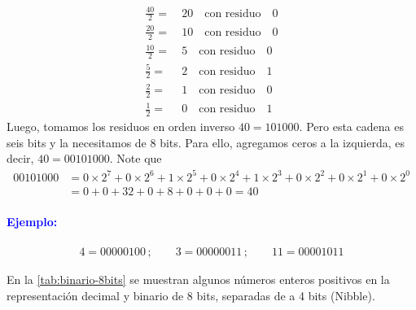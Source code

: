 \documentclass[12pt]{article}
\begin{document}
\begin{align*}
\frac{40}{2} = & ~20 \quad \text{con residuo} \quad  0 \\
\frac{20}{2} = & ~10 \quad \text{con residuo} \quad  0 \\
\frac{10}{2} = & ~5 \quad \text{con residuo} \quad  0 \\
\frac{5}{2} =  & ~2 \quad \text{con residuo} \quad  1 \\
\frac{2}{2} =  & ~1 \quad \text{con residuo} \quad  0 \\
\frac{1}{2} =  & ~0 \quad \text{con residuo} \quad  1 
\end{align*}
Luego, tomamos los residuos en orden inverso $40 = 101000$. Pero esta cadena es seis bits 
y la necesitamos de 8 bits. Para ello, agregamos ceros a la izquierda, es decir,
$40 = 00101000$. Note que
\begin{align*}
00101000 &= 0 \times 2^7 + 0 \times 2^6 + 1 \times 2^5 + 0 \times 2^4 + 1 \times 2^3 
+ 0 \times 2^2 + 0 \times 2^1 + 0 \times 2^0 \\
&= 0 + 0 + 32 + 0 + 8 + 0 + 0 + 0 
 = 40
\end{align*}

\paragraph{\textcolor{blue}{Ejemplo:}}

\begin{align*}
4 = 00000100\,; \qquad
3 = 00000011 \,; \qquad
11 = 00001011
\end{align*}

En la \autoref{tab:binario-8bits} se muestran algunos números enteros positivos en 
la representación decimal y binario de 8 bits, separadas de a 4 bits (Nibble).
\end{document}
